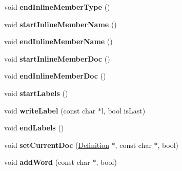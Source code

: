 \begin{DoxyCompactItemize}
\item 
\mbox{\label{class_latex_generator_abc814eeab82521846cf18686f8d92fac}} 
void {\bfseries end\+Inline\+Member\+Type} ()
\item 
\mbox{\label{class_latex_generator_ab5f38cdf65246dfa8b1c36a3273ed3cf}} 
void {\bfseries start\+Inline\+Member\+Name} ()
\item 
\mbox{\label{class_latex_generator_ab92ba4ec639de4be31f04be7333de37a}} 
void {\bfseries end\+Inline\+Member\+Name} ()
\item 
\mbox{\label{class_latex_generator_af315eca185ea2b54cafe21c589550051}} 
void {\bfseries start\+Inline\+Member\+Doc} ()
\item 
\mbox{\label{class_latex_generator_ad923c683685b854937c49870db835f48}} 
void {\bfseries end\+Inline\+Member\+Doc} ()
\item 
\mbox{\label{class_latex_generator_a71809b49388e139615299e801e09ab89}} 
void {\bfseries start\+Labels} ()
\item 
\mbox{\label{class_latex_generator_a9eb12e8e19b14d1597b58663df0475cd}} 
void {\bfseries write\+Label} (const char $\ast$l, bool is\+Last)
\item 
\mbox{\label{class_latex_generator_a5272a911be5eb0d70470fee6c11830bb}} 
void {\bfseries end\+Labels} ()
\item 
\mbox{\label{class_latex_generator_af5df048a8317a74877a26dd2a17bac8b}} 
void {\bfseries set\+Current\+Doc} (\mbox{\hyperlink{class_definition}{Definition}} $\ast$, const char $\ast$, bool)
\item 
\mbox{\label{class_latex_generator_a04cf15ca0b9c9a231adbe7e42436a1cf}} 
void {\bfseries add\+Word} (const char $\ast$, bool)
\end{DoxyCompactItemize}
